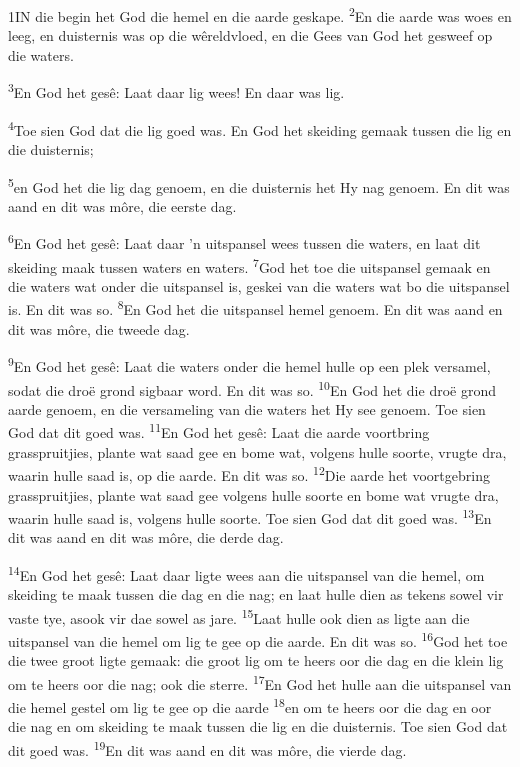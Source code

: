 \documentclass[10pt,oneside,a4paper]{memoir}
\renewcommand{\verse}[1]{\textsuperscript{#1}}
\def\biblsyntheticpar{\hfil\vadjust{\vskip\parskip}\break\indent}
\begin{document}
\setmainfont[Numbers=Uppercase]{Arial}
\mainmatter
%
\begin{paracol}{2}
\lettrine[lines=4, findent=3pt, nindent=0pt]{1}
IN die begin het God die hemel en die aarde geskape.
\biblsyntheticpar
\verse{2}En die aarde was woes en leeg, en duisternis was op die wêreldvloed, en die Gees van God het gesweef op die waters.

\verse{3}En God het gesê: Laat daar lig wees! En daar was lig.

\verse{4}Toe sien God dat die lig goed was. En God het skeiding gemaak tussen die lig en die duisternis;

\verse{5}en God het die lig dag genoem, en die duisternis het Hy nag genoem. En dit was aand en dit was môre, die eerste dag.

\verse{6}En God het gesê: Laat daar ’n uitspansel wees tussen die waters, en laat dit skeiding maak tussen waters en waters.
\verse{7}God het toe die uitspansel gemaak en die waters wat onder die uitspansel is, geskei van die waters wat bo die uitspansel is. En dit was so.
\verse{8}En God het die uitspansel hemel genoem. En dit was aand en dit was môre, die tweede dag.

\verse{9}En God het gesê: Laat die waters onder die hemel hulle op een plek versamel, sodat die droë grond sigbaar word. En dit was so.
\verse{10}En God het die droë grond aarde genoem, en die versameling van die waters het Hy see genoem. Toe sien God dat dit goed was.
\verse{11}En God het gesê: Laat die aarde voortbring grasspruitjies, plante wat saad gee en bome wat, volgens hulle soorte, vrugte dra, waarin hulle saad is, op die aarde. En dit was so.
\verse{12}Die aarde het voortgebring grasspruitjies, plante wat saad gee volgens hulle soorte en bome wat vrugte dra, waarin hulle saad is, volgens hulle soorte. Toe sien God dat dit goed was.
\verse{13}En dit was aand en dit was môre, die derde dag.

\verse{14}En God het gesê: Laat daar ligte wees aan die uitspansel van die hemel, om skeiding te maak tussen die dag en die nag; en laat hulle dien as tekens sowel vir vaste tye, asook vir dae sowel as jare.
\verse{15}Laat hulle ook dien as ligte aan die uitspansel van die hemel om lig te gee op die aarde. En dit was so.
\verse{16}God het toe die twee groot ligte gemaak: die groot lig om te heers oor die dag en die klein lig om te heers oor die nag; ook die sterre.
\verse{17}En God het hulle aan die uitspansel van die hemel gestel om lig te gee op die aarde
\verse{18}en om te heers oor die dag en oor die nag en om skeiding te maak tussen die lig en die duisternis. Toe sien God dat dit goed was.
\verse{19}En dit was aand en dit was môre, die vierde dag.


\end{paracol}
\end{document}
